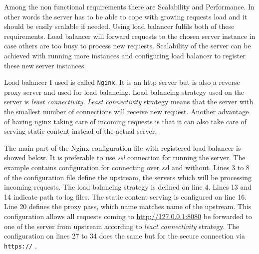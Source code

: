 \documentclass[thesis=M,english]{FITthesis}[2012/10/20]
\begin{document}
Among the non functional requirements there are Scalability and Performance. In other words the server has to be able to cope with growing requests load and it should be easily scalable if needed. Using load balancer fulfils both of these requirements. Load balancer will forward requests to the chosen server instance in case others are too busy to process new requests. Scalability of the server can be achieved with running more instances and configuring load balancer to register these new server instances.

Load balancer I used is called \verb|Nginx|. It is an http server but is also a reverse proxy server and used for load balancing. Load balancing strategy used on the server is \textit{least connectivity}. \textit{Least connectivity} strategy means that the server with the smallest number of connections will receive new request. \cite{nginx-lb} Another advantage of having nginx taking care of incoming requests is that it can also take care of serving static content instead of the actual server. 

The main part of the Nginx configuration file with registered load balancer is showed below. It is preferable to use \textit{ssl} connection for running the server. The example contains configuration for connecting over \textit{ss}l and without. Lines 3 to 8 of the configuration file define the upstream, the servers which will be processing incoming requests. The load balancing strategy is defined on line 4. Lines 13 and 14 indicate path to log files. The static content serving is configured on line 16. Line 20 defines the proxy pass, which name matches name of the upstream. This configuration allows all requests coming to \url{http://127.0.0.1:8080} be forwarded to one of the server from upstream according to \textit{leact connectivity} strategy. The configuration on lines 27 to 34 does the same but for the secure connection via \verb|https://| .
\end{document}
